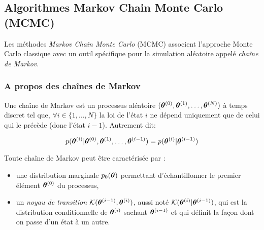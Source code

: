 
\subsection{Algorithmes Markov Chain Monte Carlo (MCMC)}

Les méthodes \textit{Markov Chain Monte Carlo} (MCMC) associent l'approche Monte Carlo classique avec un outil spécifique pour la simulation aléatoire appelé \textit{chaîne de Markov}.\\

\subsubsection{A propos des chaînes de Markov}

Une chaîne de Markov est un processus aléatoire  $({\bm{\theta}}^{(0)}, {\bm{\theta}}^{(1)}, \dots, {\bm{\theta}}^{(N)})$ à temps discret tel que, $\forall i \in \{1, \dots, N\}$ la loi de l'état $i$ ne dépend uniquement que de celui qui le précède (donc l'état $i-1$). Autrement dit:

\begin{equation}
p({{\bm{\theta}}^{(i)}} | {\bm{\theta}}^{(0)}, {\bm{\theta}}^{(1)}, \dots, {{\bm{\theta}}^{(i-1)}}) = p({{\bm{\theta}}^{(i)}}|{{\bm{\theta}}^{(i-1)}})
\label{eq_propriete_markov}
\end{equation}

Toute chaîne de Markov peut être caractérisée par :
\begin{itemize}
	\item une distribution marginale $p_0({\bm{\theta}})$ permettant d'échantillonner le premier élément ${\bm{\theta}}^{(0)}$ du processus,
	\item un \textit{noyau de transition} ${\mathcal{K}}({{\bm{\theta}}^{(i-1)}},{{\bm{\theta}}^{(i)}})$, aussi noté ${\mathcal{K}}({{\bm{\theta}}^{(i)}}|{{\bm{\theta}}^{(i-1)}})$, qui est la distribution conditionnelle de ${{\bm{\theta}}^{(i)}}$ sachant ${{\bm{\theta}}^{(i-1)}}$ et qui définit la façon dont on passe d'un état à un autre.\\
\end{itemize}


